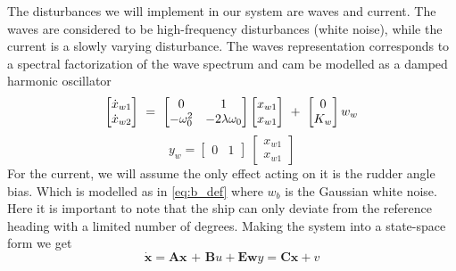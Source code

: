 The disturbances we will implement in our system are waves and current. The waves are considered to be high-frequency disturbances (white noise), while the current is a slowly varying disturbance. The waves representation corresponds to a spectral factorization of the wave spectrum and cam be modelled as a damped harmonic oscillator
\begin{equation*}
    \begin{bmatrix}
        \dot{x}_{w1}\\
        \dot{x}_{w2}
    \end{bmatrix} \ = \ \begin{bmatrix}
        0 & 1 \\ 
        -\omega_0^2 & -2\lambda \omega_0
    \end{bmatrix} \begin{bmatrix}
        x_{w1} \\
        x_{w1}
    \end{bmatrix} \ + \ \begin{bmatrix}
        0 \\ K_w
    \end{bmatrix} w_w \\
\end{equation*}
\begin{equation*}
    y_w = \begin{bmatrix}
        0 & 1
    \end{bmatrix} \ \begin{bmatrix}
        x_{w1} \\
        x_{w1}
    \end{bmatrix}
\end{equation*}
For the current, we will assume the only effect acting on it is the rudder angle bias. Which is modelled as in \cref{eq:b_def} where $w_b$ is the Gaussian white noise. Here it is important to note that the ship can only deviate from the reference heading with a limited number of degrees.
\newline 
\newline
Making the system into a state-space form we get
\begin{subequations} \label{eq:state_space}
    \begin{equation}
        \dot{\textbf{x}} = \textbf{Ax + B}u + \textbf{Ew}
    \end{equation}
    \begin{equation}
        y = \textbf{Cx} + v
    \end{equation}
\end{subequations}
